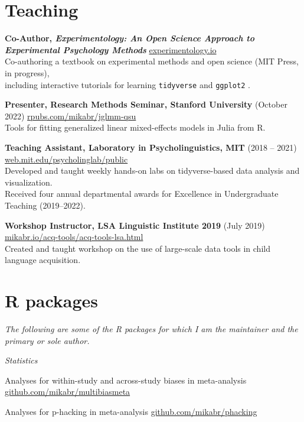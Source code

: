 \documentclass[11pt,]{article}
\newcommand{\project}[4]{
  \textbf{#1} #3 \hfill \small \href{http://#2}{#2} \normalsize \\ \hangindent=15pt #4
}
\newcommand{\plab}[1]{
  \footnotesize \texttt{#1} \normalsize
}
\newcommand{\hlink}[1]{
  \hfill \small \href{http://#1}{#1} \normalsize
}
\begin{document}
\hypertarget{teaching}{%
\section{\texorpdfstring{\faUsers \hspace{1pt}
Teaching}{ Teaching}}\label{teaching}}

\project{Co-Author, \em{Experimentology: An Open Science Approach to Experimental Psychology Methods}}{experimentology.io}{}{Co-authoring a textbook on experimental methods and open science (MIT Press, in progress),\\ including interactive tutorials for learning \plab{tidyverse} and \plab{ggplot2}.}

\project{Presenter, Research Methods Seminar, Stanford University}{rpubs.com/mikabr/jglmm-qsu}{(October 2022)}{Tools for fitting generalized linear mixed-effects models in Julia from R.}

\project{Teaching Assistant, Laboratory in Psycholinguistics, MIT}{web.mit.edu/psycholinglab/public}{(2018 -- 2021)}{Developed and taught weekly hands-on labs on tidyverse-based data analysis and visualization.\\Received four annual departmental awards for Excellence in Undergraduate Teaching (2019--2022).}

\project{Workshop Instructor, LSA Linguistic Institute 2019}{mikabr.io/acq-tools/acq-tools-lsa.html}{(July 2019)}{Created and taught workshop on the use of large-scale data tools in child language acquisition.}

\hypertarget{r-packages}{%
\section{\texorpdfstring{\faCube \hspace{1pt} R
packages}{ R packages}}\label{r-packages}}

\small

\emph{The following are some of the R packages for which I am the
maintainer and the primary or sole author.} \normalsize

\emph{Statistics}

\begin{description}[leftmargin=!,labelwidth=\widthof{\plab{truncnormbayes}}]
  \item[\plab{multibiasmeta}] Analyses for within-study and across-study biases in meta-analysis \hlink{github.com/mikabr/multibiasmeta}
  \item[\plab{phacking}] Analyses for p-hacking in meta-analysis \hlink{github.com/mikabr/phacking}
\end{description}
\end{document}
